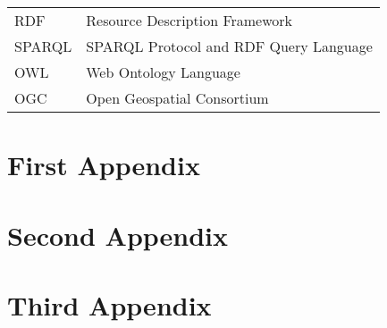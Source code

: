 \documentclass[inscr,ack,preface]{diphdthesis}
\begin{document}
\backmatter


\abbreviations
\begin{center}
	\renewcommand{\arraystretch}{1.5}
	\begin{longtable}{ l @{\qquad} l }
	\toprule
	RDF    & Resource Description Framework \\
	SPARQL & SPARQL Protocol and RDF Query Language \\
	OWL    & Web Ontology Language \\
	OGC    & Open Geospatial Consortium \\
	\bottomrule
	\end{longtable}
\end{center}



\begin{appendix}
\appendixstartedtrue

{}

\chapter{First Appendix}
\chapter{Second Appendix}
\chapter{Third Appendix}
\end{appendix}



\printbibliography[title={References}]
\end{document}

